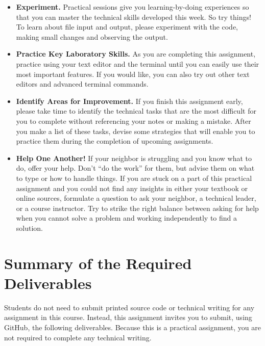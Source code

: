 \documentclass[11pt]{article}
\begin{document}
\vspace*{-.05in}
\begin{itemize}

\itemsep 0in

\item {\bf Experiment.} Practical sessions give you learning-by-doing
  experiences so that you can master the technical skills developed this week.
  So try things! To learn about file input and output, please experiment with
  the code, making small changes and observing the output.

\item {\bf Practice Key Laboratory Skills.} As you are completing this
  assignment, practice using your text editor and the terminal until you can
  easily use their most important features. If you would like, you can also try
  out other text editors and advanced terminal commands.

\item {\bf Identify Areas for Improvement.} If you finish this assignment early,
  please take time to identify the technical tasks that are the most difficult
  for you to complete without referencing your notes or making a mistake. After
  you make a list of these tasks, devise some strategies that will enable you to
  practice them during the completion of upcoming assignments.

\item {\bf Help One Another!} If your neighbor is struggling and you know what
  to do, offer your help. Don't ``do the work'' for them, but advise them on
  what to type or how to handle things. If you are stuck on a part of this
  practical assignment and you could not find any insights in either your
  textbook or online sources, formulate a question to ask your neighbor, a
  technical leader, or a course instructor. Try to strike the right balance
  between asking for help when you cannot solve a problem and working
  independently to find a solution.

\end{itemize}

\section*{Summary of the Required Deliverables}

\noindent Students do not need to submit printed source code or technical
writing for any assignment in this course. Instead, this assignment invites you
to submit, using GitHub, the following deliverables. Because this is a practical
assignment, you are not required to complete any technical writing.
\end{document}
